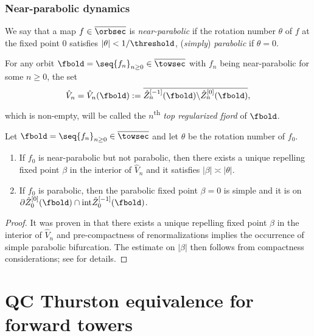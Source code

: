 \documentclass{amsart}
\begin{document}
\subsubsection{Near-parabolic dynamics}

\begin{definition}
    We say that a map $f \in \overline{\orbsec}$ is \emph{near-parabolic} if the rotation number $\theta$ of $f$ at the fixed point $0$ satisfies $|\theta| < 1/\threshold$, (\emph{simply}) \emph{parabolic} if $\theta = 0$.
\end{definition}

\begin{definition}
    For any orbit $\fbold = \seq{f_n}_{n\geq 0} \in \overline{\towsec}$ with $f_n$ being near-parabolic for some $n \geq 0$, the set
\[
    \hat{V}_n = \hat{V}_n(\fbold) := \overline{ \hat{Z}_n^{[-1]}(\fbold) \backslash \hat{Z}_n^{[0]}(\fbold) },
\]
    which is non-empty, will be called the $n$\textsuperscript{th} \emph{top regularized fjord} of $\fbold$.
\end{definition}

\begin{theorem}
\label{thm:beta-fixed-points}
    Let $\fbold = \seq{f_n}_{n\geq 0} \in \overline{\towsec}$ and let $\theta$ be the rotation number of $f_0$.
    \begin{enumerate}
        \item If $f_0$ is near-parabolic but not parabolic, then there exists a unique repelling fixed point $\beta$ in the interior of $\hat{V}_n$ and it satisfies $|\beta| \asymp |\theta|$.
        \item If $f_0$ is parabolic, then the parabolic fixed point $\beta = 0$ is simple and it is on $\partial \hat{Z}_0^{[0]}(\fbold) \cap \textnormal{int} \hat{Z}_0^{[-1]}(\fbold)$.
    \end{enumerate}
\end{theorem}

\begin{proof}
    It was proven in \cite{DLy26a} that there exists a unique repelling fixed point $\beta$ in the interior of $\hat{V}_n$ and pre-compactness of renormalizations implies the occurrence of simple parabolic bifurcation.
    The estimate on $|\beta|$ then follows from compactness considerations; see \cite{Lim26b} for details.
\end{proof}

\section{QC Thurston equivalence for forward towers}
\label{sec:qc-thurston-equivalence}
\end{document}
